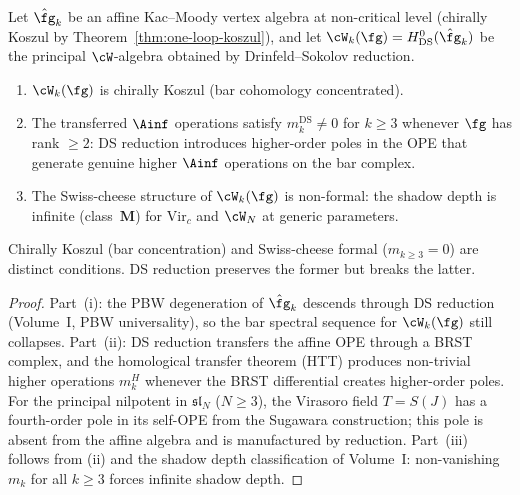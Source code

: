 \begin{theorem}
\label{thm:ds-koszul-obstruction}
Let\/ $\hat{\fg}_k$ be an affine Kac--Moody vertex algebra
at non-critical level \textup{(}chirally Koszul by
Theorem~\textup{\ref{thm:one-loop-koszul})}, and let\/
$\cW_k(\fg) = H^0_{\mathrm{DS}}(\hat{\fg}_k)$ be the
principal $\cW$-algebra obtained by Drinfeld--Sokolov
reduction.
\begin{enumerate}[label=\textup{(\roman*)}]
\item $\cW_k(\fg)$ is chirally Koszul
 \textup{(}bar cohomology concentrated\textup{)}.
\item The transferred $\Ainf$ operations satisfy
 $m_k^{\mathrm{DS}} \neq 0$ for $k \ge 3$ whenever
 $\fg$ has rank $\ge 2$: DS reduction introduces
 higher-order poles in the OPE that generate genuine
 higher $\Ainf$ operations on the bar complex.
\item The Swiss-cheese structure of\/ $\cW_k(\fg)$ is
 non-formal: the shadow depth is infinite
 \textup{(}class~$\mathbf{M}$\textup{)} for
 $\mathrm{Vir}_c$ and $\cW_N$ at generic parameters.
\end{enumerate}
Chirally Koszul \textup{(}bar concentration\textup{)}
and Swiss-cheese formal \textup{(}$m_{k \ge 3} = 0$\textup{)}
are distinct conditions. DS reduction preserves the former
but breaks the latter.
\end{theorem}

\begin{proof}
Part~(i): the PBW degeneration of\/ $\hat{\fg}_k$
descends through DS reduction
(Volume~I, PBW universality), so the bar spectral
sequence for $\cW_k(\fg)$ still collapses.
Part~(ii): DS reduction transfers the affine OPE through
a BRST complex, and the homological transfer theorem
(HTT) produces non-trivial higher operations $m_k^H$
whenever the BRST differential creates higher-order
poles. For the principal nilpotent in $\mathfrak{sl}_N$
($N \ge 3$), the Virasoro field $T = S(J)$ has a
fourth-order pole in its self-OPE from the Sugawara
construction; this pole is absent from the affine algebra
and is manufactured by reduction.
Part~(iii) follows from (ii) and the shadow depth
classification of Volume~I: non-vanishing $m_k$ for all
$k \ge 3$ forces infinite shadow depth.
\end{proof}

